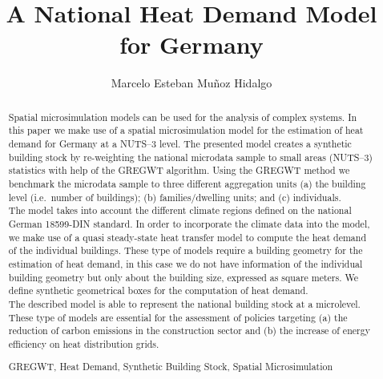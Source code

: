 \documentclass[runningheads,a4paper]{llncs}
\newcommand{\keywords}[1]{\par\addvspace\baselineskip
\noindent\keywordname\enspace\ignorespaces#1}
\begin{document}
\lstset{language=R} 
\mainmatter%

\title{A National Heat Demand Model for Germany}


\author{Marcelo Esteban Mu\~noz Hidalgo}


\maketitle

\begin{abstract}

Spatial microsimulation models can be used for the analysis of complex systems.
In this paper we make use of a spatial microsimulation model for the
estimation of heat demand for Germany at a NUTS--3 level.
The presented model creates a synthetic building stock by re-weighting the
national microdata sample to small areas (NUTS--3) statistics with help of the
GREGWT algorithm.
Using the GREGWT method we benchmark the microdata sample to three different
aggregation units (a) the building level (i.e.\ number of buildings); (b)
families/dwelling units; and (c) individuals.
\\

The model takes into account the different climate regions defined on the
national German 18599-DIN standard.
In order to incorporate the climate data into the model, we make use of a quasi
steady-state heat transfer model to compute the heat demand of the individual
buildings.
These type of models require a building geometry for the estimation of heat
demand, in this case we do not have information of the individual building
geometry but only about the building size, expressed as square meters.
We define synthetic geometrical boxes for the computation of heat demand.
\\

The described model is able to represent the national building stock at a
microlevel.
These type of models are essential for the assessment of policies targeting
(a) the reduction of carbon emissions in the construction sector and
(b) the increase of energy efficiency on heat distribution grids.
\\

\keywords{GREGWT, Heat Demand, Synthetic Building Stock, Spatial Microsimulation}
\end{abstract}
\end{document}

